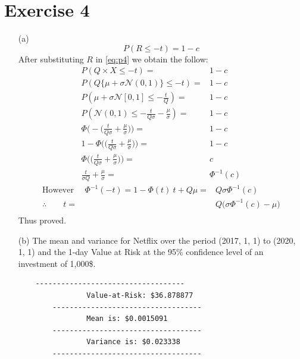 \documentclass[12pt,a4paper]{article}
\begin{document}
\section*{Exercise 4}
\begin{enumerate}
	\item[(a)] 
		\begin{equation}
        P(R\leq -t) = 1-c
        \label{eq:p4}
    \end{equation}
    After substituting $R$   in \eqref{eq:p4} we obtain the follow:
    \begin{align*}
        P(Q\times X\le -t) =& 1-c\\
        P(Q\{\mu + \sigma \mathcal{N}(0,1)\} \le -t)  =& 1-c\\
        P(\mu +\sigma \mathcal{N}[0,1] \le - \frac{t}{Q}) =& 1-c\\
        P ( \mathcal{N}(0,1)\leq -\frac{t}{Q\sigma} - \frac{\mu}{\sigma} ) =& 1-c\\
        \Phi\bigg( -\bigg( \frac{t}{Q \sigma} + \frac{\mu}{\sigma}\bigg)\bigg) =& 1-c\\
        1 - \Phi\bigg(\bigg( \frac{t}{Q \sigma} + \frac{\mu}{\sigma}\bigg)\bigg) =& 1-c\\
        \Phi\bigg( \bigg( \frac{t}{Q \sigma} + \frac{\mu}{\sigma}\bigg)\bigg) =& c\\
        \frac{t}{\sigma Q} + \frac{\mu}{\sigma} = & \Phi^{-1} (c)
    \end{align*}
    \begin{align*}
    		   \text{However } \quad  \Phi^{-1} (-t)  = 1- \Phi (t)\
        t + Q\mu = & Q \sigma \Phi^{-1} (c)\\
        \therefore \quad \quad t = & Q\bigg( \sigma \Phi^{-1}(c) - \mu  \bigg)\\
    \end{align*}
Thus proved.
\item[(b)]
	 The mean and variance for Netflix  over the period (2017, 1, 1) to (2020, 1, 1) and  the 1-day Value at Risk at the 95\% confidence level of an investment of 1,000\$.
	 \begin{verbatim}
	-----------------------------------
				Value-at-Risk: $36.878877
		-----------------------------------
				Mean is: $0.0015091
		-----------------------------------
				Variance is: $0.023338
		-----------------------------------
	 \end{verbatim}
\end{enumerate}
\end{document}
